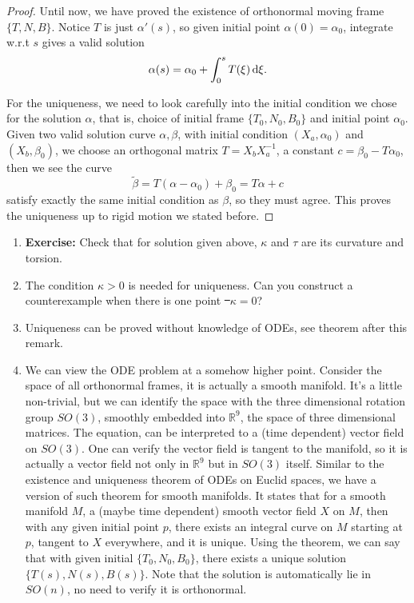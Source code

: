 \begin{proof}
    Until now, we have proved the existence of orthonormal moving frame
    \(\{T,N,B\}\). Notice \(T\) is just \(\alpha'(s)\), so given initial point
    \(\alpha(0)=\alpha_0\), integrate w.r.t \(s\) gives a valid solution \[
        \alpha(s)=\alpha_0+\int_{0}^{s}T(\xi)\dif \xi
    .\]

    For the uniqueness, we need to look carefully into the initial condition we
    chose for the solution \(\alpha\), that is, choice of initial frame
    \(\{T_0,N_0,B_0\}\) and initial point \(\alpha_0\). Given two valid solution
    curve \(\alpha,\beta\), with initial condition \((X_a,\alpha_0)\) and \((X_b,
    \beta_0)\), we choose an orthogonal matrix \(T=X_b X_a^{-1}\), a constant
    \(c=\beta_0-T\alpha_0\), then we see the curve \[
        \tilde{\beta}=T(\alpha-\alpha_0)+\beta_0=T\alpha+c
    \] satisfy exactly the same initial condition as \(\beta\), so they must agree.
    This proves the uniqueness up to rigid motion we stated before.
\end{proof}

\begin{remark}\hfill
\begin{enumerate}[(1)]
    \item \textbf{Exercise:} Check that for solution given above, \(\kappa\) and
        \(\tau\) are its curvature and torsion.
    \item The condition \(\kappa>0\) is needed for uniqueness. Can you construct a
        counterexample when there is one point \st\ \(\kappa=0\)?
    \item Uniqueness can be proved without knowledge of ODEs, see theorem after this remark.
    \item We can view the ODE problem at a somehow higher point. Consider the space
        of all orthonormal frames, it is actually a smooth manifold. It's a little
        non-trivial, but we can identify the space with the three dimensional rotation
        group \(SO(3)\), smoothly embedded into \(\mathbb{R}^9\), the space of
        three dimensional matrices. The equation, can be interpreted to a (time
        dependent) vector field on \(SO(3)\). One can verify the vector field
        is tangent to the manifold, so it is actually a vector field not only in
        \(\mathbb{R}^9\) but in \(SO(3)\) itself. Similar to the existence and
        uniqueness theorem of ODEs on Euclid spaces, we have a version of such
        theorem for smooth manifolds. It states that for a smooth manifold \(M\),
        a (maybe time dependent) smooth vector field \(X\) on \(M\), then with any
        given initial point \(p\), there exists an integral curve on \(M\) starting
        at \(p\), tangent to \(X\) everywhere, and it is unique. Using the theorem,
        we can say that with given initial \(\{T_0,N_0,B_0\}\), there exists a
        unique solution \(\{T(s),N(s),B(s)\}\). Note that the solution is
        automatically lie in \(SO(n)\), no need to verify it is orthonormal.
\end{enumerate}
\end{remark}

